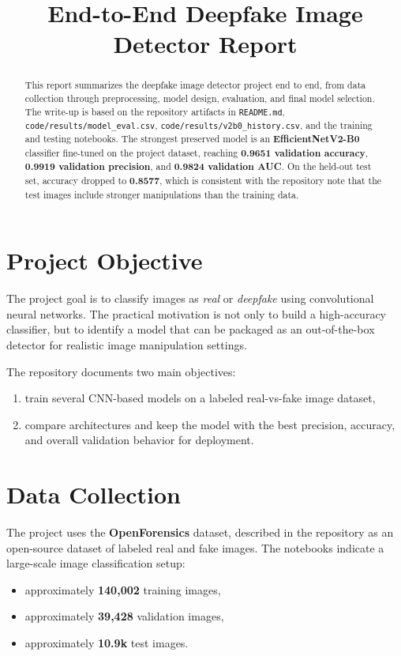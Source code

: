 \documentclass[11pt]{article}
\title{End-to-End Deepfake Image Detector Report}
\author{}
\date{}
\begin{document}
\maketitle

\begin{abstract}
This report summarizes the deepfake image detector project end to end, from data collection through preprocessing, model design, evaluation, and final model selection. The write-up is based on the repository artifacts in \texttt{README.md}, \texttt{code/results/model\_eval.csv}, \texttt{code/results/v2b0\_history.csv}, and the training and testing notebooks. The strongest preserved model is an \textbf{EfficientNetV2-B0} classifier fine-tuned on the project dataset, reaching \textbf{0.9651 validation accuracy}, \textbf{0.9919 validation precision}, and \textbf{0.9824 validation AUC}. On the held-out test set, accuracy dropped to \textbf{0.8577}, which is consistent with the repository note that the test images include stronger manipulations than the training data.
\end{abstract}

\section{Project Objective}

The project goal is to classify images as \emph{real} or \emph{deepfake} using convolutional neural networks. The practical motivation is not only to build a high-accuracy classifier, but to identify a model that can be packaged as an out-of-the-box detector for realistic image manipulation settings.

The repository documents two main objectives:
\begin{enumerate}[leftmargin=1.5em]
    \item train several CNN-based models on a labeled real-vs-fake image dataset,
    \item compare architectures and keep the model with the best precision, accuracy, and overall validation behavior for deployment.
\end{enumerate}

\section{Data Collection}

The project uses the \textbf{OpenForensics} dataset, described in the repository as an open-source dataset of labeled real and fake images. The notebooks indicate a large-scale image classification setup:
\begin{itemize}[leftmargin=1.5em]
    \item approximately \textbf{140{,}002} training images,
    \item approximately \textbf{39{,}428} validation images,
    \item approximately \textbf{10.9k} test images.
\end{itemize}
\end{document}
